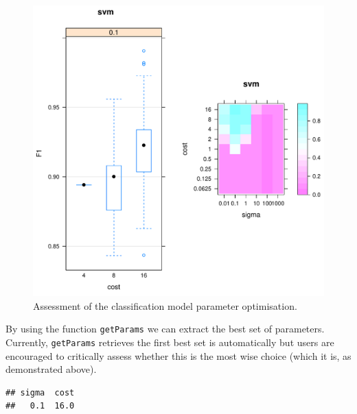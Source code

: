 \begin{knitrout}
\color{fgcolor}\begin{kframe}
\begin{alltt}
\end{alltt}
\end{kframe}
\end{knitrout}

\begin{figure}[!ht]
  \centering
\begin{knitrout}
\color{fgcolor}
\includegraphics[width=.65\textwidth]{figure/visualiseOptHide-1} 

\end{knitrout}
  \caption{Assessment of the classification model parameter optimisation.}
  \label{fig:visualisOptHide}
\end{figure}


By using the function \texttt{getParams} we can extract the best set
of parameters. Currently, \texttt{getParams} retrieves the first best
set is automatically but users are encouraged to critically assess
whether this is the most wise choice (which it is, as demonstrated
above).

\begin{knitrout}
\color{fgcolor}\begin{kframe}
\begin{alltt}
 \hlkwb{<-} 
\end{alltt}
\begin{verbatim}
## sigma  cost 
##   0.1  16.0
\end{verbatim}
\end{kframe}
\end{knitrout}

